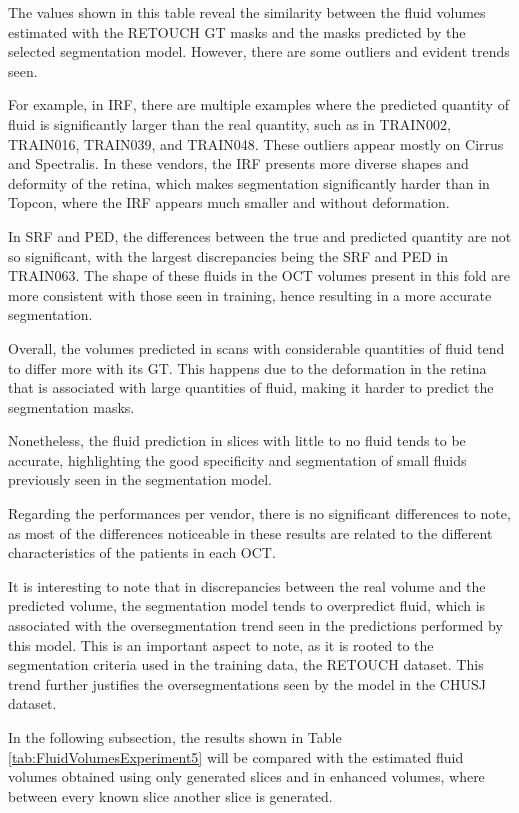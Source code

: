 The values shown in this table reveal the similarity between the fluid volumes estimated with the RETOUCH GT masks and the masks predicted by the selected segmentation model. However, there are some outliers and evident trends seen.
\par
For example, in IRF, there are multiple examples where the predicted quantity of fluid is significantly larger than the real quantity, such as in TRAIN002, TRAIN016, TRAIN039, and TRAIN048. These outliers appear mostly on Cirrus and Spectralis. In these vendors, the IRF presents more diverse shapes and deformity of the retina, which makes segmentation significantly harder than in Topcon, where the IRF appears much smaller and without deformation.
\par
In SRF and PED, the differences between the true and predicted quantity are not so significant, with the largest discrepancies being the SRF and PED in TRAIN063. The shape of these fluids in the OCT volumes present in this fold are more consistent with those seen in training, hence resulting in a more accurate segmentation.
\par
Overall, the volumes predicted in scans with considerable quantities of fluid tend to differ more with its GT. This happens due to the deformation in the retina that is associated with large quantities of fluid, making it harder to predict the segmentation masks.
\par
Nonetheless, the fluid prediction in slices with little to no fluid tends to be accurate, highlighting the good specificity and segmentation of small fluids previously seen in the segmentation model.
\par
Regarding the performances per vendor, there is no significant differences to note, as most of the differences noticeable in these results are related to the different characteristics of the patients in each OCT.
\par
It is interesting to note that in discrepancies between the real volume and the predicted volume, the segmentation model tends to overpredict fluid, which is associated with the oversegmentation trend seen in the predictions performed by this model. This is an important aspect to note, as it is rooted to the segmentation criteria used in the training data, the RETOUCH dataset. This trend further justifies the oversegmentations seen by the model in the CHUSJ dataset.
\par
In the following subsection, the results shown in Table \ref{tab:FluidVolumesExperiment5} will be compared with the estimated fluid volumes obtained using only generated slices and in enhanced volumes, where between every known slice another slice is generated.


